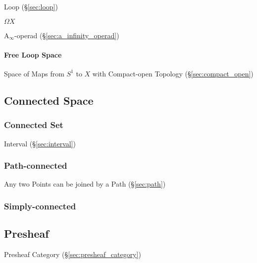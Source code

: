 Loop (\S\ref{sec:loop})

$\Omega X$

A$_\infty$-operad (\S\ref{sec:a_infinity_operad})



\paragraph{Free Loop Space}\label{sec:free_loop_space}\hfill

Space of Maps from $S^1$ to $X$ with Compact-open Topology
(\S\ref{sec:compact_open})



\subsection{Connected Space}\label{sec:connected_space}

\subsubsection{Connected Set}\label{sec:connected_set}

Interval (\S\ref{sec:interval})



\subsubsection{Path-connected}\label{sec:path_connected}

Any two Points can be joined by a Path (\S\ref{sec:path})



\subsubsection{Simply-connected}\label{sec:simply_connected}



\subsection{Presheaf}\label{sec:presheaf}

Presheaf Category (\S\ref{sec:presheaf_category})



